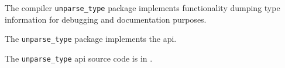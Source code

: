 
The compiler {\tt unparse\_type} package implements functionality dumping type information 
for debugging and documentation purposes.

The {\tt unparse\_type} package implements the  api.

The {\tt unparse\_type} api source code is in .

